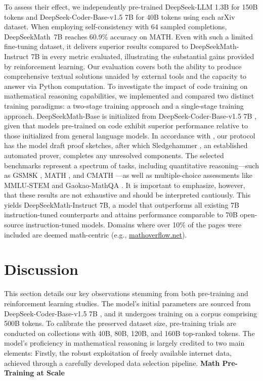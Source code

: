 To assess their effect, we independently pre-trained DeepSeek-LLM 1.3B for 150B tokens and DeepSeek-Coder-Base-v1.5 7B for 40B tokens using each arXiv dataset. When employing self-consistency with 64 sampled completions, DeepSeekMath~7B reaches 60.9\% accuracy on MATH. Even with such a limited fine-tuning dataset, it delivers superior results compared to DeepSeekMath-Instruct 7B in every metric evaluated, illustrating the substantial gains provided by reinforcement learning. Our evaluation covers both the ability to produce comprehensive textual solutions unaided by external tools and the capacity to answer via Python computation. To investigate the impact of code training on mathematical reasoning capabilities, we implemented and compared two distinct training paradigms: a two-stage training approach and a single-stage training approach. DeepSeekMath-Base is initialized from DeepSeek-Coder-Base-v1.5 7B \citep{deepseek-coder}, given that models pre-trained on code exhibit superior performance relative to those initialized from general language models. In accordance with \cite{dsp_proof}, our protocol has the model draft proof sketches, after which Sledgehammer \citep{sledgehammer}, an established automated prover, completes any unresolved components. The selected benchmarks represent a spectrum of tasks, including quantitative reasoning—such as GSM8K \citep{gsm8k}, MATH \citep{MATH}, and CMATH \citep{wei2023cmath}—as well as multiple-choice assessments like MMLU-STEM \citep{mmlu} and Gaokao-MathQA \citep{agieval}. It is important to emphasize, however, that these results are not exhaustive and should be interpreted cautiously. This yields DeepSeekMath-Instruct 7B, a model that outperforms all existing 7B instruction-tuned counterparts and attains performance comparable to 70B open-source instruction-tuned models. Domains where over 10\% of the pages were included are deemed math-centric (e.g., \url{mathoverflow.net}). \section{Discussion}
This section details our key observations stemming from both pre-training and reinforcement learning studies. The model's initial parameters are sourced from DeepSeek-Coder-Base-v1.5 7B \citep{deepseek-coder}, and it undergoes training on a corpus comprising 500B tokens. To calibrate the preserved dataset size, pre-training trials are conducted on collections with 40B, 80B, 120B, and 160B top-ranked tokens. The model’s proficiency in mathematical reasoning is largely credited to two main elements: Firstly, the robust exploitation of freely available internet data, achieved through a carefully developed data selection pipeline. \textbf{Math Pre-Training at Scale}

